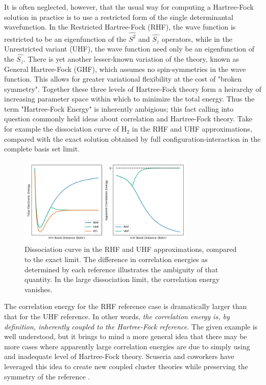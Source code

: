 \documentclass{revtex4}
\begin{document}
      It is often neglected, however, that the usual way for computing a Hartree-Fock solution in 
      practice
    is to use a restricted form of the single determinantal wavefunction. In the Restricted 
    Hartree-Fock (RHF), the wave function is restricted to be an eigenfunction of the $\hat{S^2}$ 
    and $\hat{S_z}$ 
    operators, while in the Unrestricted variant (UHF), the wave function need only be an 
    eigenfunction 
    of the $\hat{S_z}$. There is yet another lesser-known variation of the theory, known as General 
    Hartree-Fock (GHF), which assumes no spin-symmetries in the wave function. This allows for 
    greater
    variational flexibility at the cost of "broken symmetry". Together these three levels of 
    Hartree-Fock theory form a heirarchy of increasing parameter space within which to minimize the 
    total energy. Thus the term "Hartree-Fock Energy" is inherently ambigious; this fact calling 
    into question commonly held ideas about correlation and Hartree-Fock theory. Take for example 
    the dissociation curve of H$_2$ in the RHF and UHF approximations, compared with the exact 
    solution obtained by full configuration-interaction in the complete basis set limit. 
    
    \begin{figure}[H]
      \centering
      \includegraphics[width=0.75\textwidth]{../figures/H2_curves.png}
      \caption{Dissociation curve in the RHF and UHF approximations, compared to the 
               exact limit. The difference in correlation energies as determined by 
               each reference illustrates the ambiguity of that quantity. In the large
               dissociation limit, the correlation energy vanishes.}
      \label{h2diss}
    \end{figure}
    
    The correlation energy for the RHF reference case is dramatically larger than that for the UHF 
    reference. In other words, \emph{the correlation energy is, by definition, inherently coupled 
    to the 
    Hartree-Fock reference}. The given example is well understood, but it brings to mind a more 
    general idea that there may be more cases where apparently large correlation energies are due 
    to simply 
    using and inadequate level of Hartree-Fock theory. Scuseria and coworkers have leveraged this 
    idea to create new coupled cluster theories while preserving the symmetry of the reference 
    \cite{Gomez2016}. 
    
\end{document}
